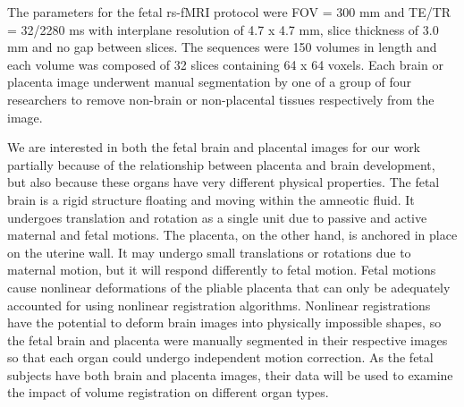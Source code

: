 The parameters for the fetal rs-fMRI protocol were FOV = 300 mm and TE/TR = 32/2280 ms with interplane resolution of 4.7 x 4.7 mm, slice thickness of 3.0 mm and no gap between slices. The sequences were 150 volumes in length and each volume was composed of 32 slices containing 64 x 64 voxels. Each brain or placenta image underwent manual segmentation by one of a group of four researchers to remove non-brain or non-placental tissues respectively from the image. %




We are interested in both the fetal brain and placental images for our work partially because of the relationship between placenta and brain development, but also because these organs have very different physical properties. The fetal brain is a rigid structure floating and moving within the amneotic fluid. It undergoes translation and rotation as a single unit due to passive and active maternal and fetal motions. The placenta, on the other hand, is anchored in place on the uterine wall. It may undergo small translations or rotations due to maternal motion, but it will respond differently to fetal motion. Fetal motions cause nonlinear deformations of the pliable placenta that can only be adequately accounted for using nonlinear registration algorithms. Nonlinear registrations have the potential to deform brain images into physically impossible shapes, so the fetal brain and placenta were manually segmented in their respective images so that each organ could undergo independent motion correction. As the fetal subjects have both brain and placenta images, their data will be used to examine the impact of volume registration on different organ types.




